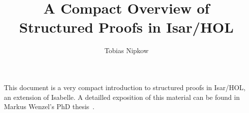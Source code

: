 \documentclass[11pt,a4paper]{article}
\begin{document}
\title{A Compact Overview of Structured Proofs in Isar/HOL}
\author{Tobias Nipkow}
\date{}
\maketitle

\noindent
This document is a very compact introduction to structured proofs in
Isar/HOL, an extension of Isabelle. A detailled exposition of this material
can be found in Markus Wenzel's PhD thesis~\cite{Wenzel-PhD}.



%





\end{document}
